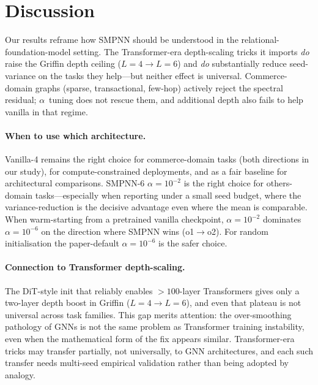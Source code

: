 \documentclass{article}
\begin{document}
\section{Discussion}
\label{sec:discussion}

Our results reframe how SMPNN should be understood in the relational-foundation-model setting. The Transformer-era depth-scaling tricks it imports \emph{do} raise the Griffin depth ceiling ($L{=}4 \to L{=}6$) and \emph{do} substantially reduce seed-variance on the tasks they help---but neither effect is universal. Commerce-domain graphs (sparse, transactional, few-hop) actively reject the spectral residual; $\alpha$~tuning does not rescue them, and additional depth also fails to help vanilla in that regime.

\paragraph{When to use which architecture.}
Vanilla-4 remains the right choice for commerce-domain tasks (both directions in our study), for compute-constrained deployments, and as a fair baseline for architectural comparisons. SMPNN-6 $\alpha{=}10^{-2}$ is the right choice for others-domain tasks---especially when reporting under a small seed budget, where the variance-reduction is the decisive advantage even where the mean is comparable. When warm-starting from a pretrained vanilla checkpoint, $\alpha{=}10^{-2}$ dominates $\alpha{=}10^{-6}$ on the direction where SMPNN wins (o1$\to$o2). For random initialisation the paper-default $\alpha{=}10^{-6}$ is the safer choice.

\paragraph{Connection to Transformer depth-scaling.}
The DiT-style init that reliably enables ${>}100$-layer Transformers gives only a two-layer depth boost in Griffin ($L{=}4 \to L{=}6$), and even that plateau is not universal across task families. This gap merits attention: the over-smoothing pathology of GNNs is not the same problem as Transformer training instability, even when the mathematical form of the fix appears similar. Transformer-era tricks may transfer partially, not universally, to GNN architectures, and each such transfer needs multi-seed empirical validation rather than being adopted by analogy.
\end{document}
